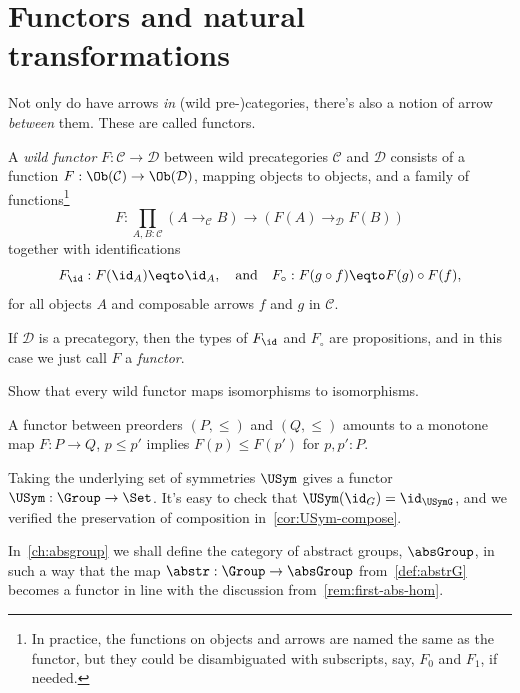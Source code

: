 \section{Functors and natural transformations}
\label{sec:naturality}

Not only do have arrows \emph{in} (wild pre-)categories, there's also
a notion of arrow \emph{between} them. These are called functors.
\begin{definition}\label{def:functor}
  A \emph{wild functor}
  $F : \mathcal C \to \mathcal D$
  between wild precategories $\mathcal C$ and $\mathcal D$
  consists of a function
  $F : \Ob(\mathcal C) \to \Ob(\mathcal D)$,
  mapping objects to objects,
  and a family of functions\footnote{%
    In practice, the functions on objects and arrows are named the same as
    the functor, but they could be disambiguated with subscripts,
    say, $F_0$ and $F_1$, if needed.}
  \[
    F : \prod_{A,B:\mathcal C}(A \to_{\mathcal C} B) \to (F(A) \to_{\mathcal D} F(B))
  \]
  together with identifications
  \[
    F_{\id} : F(\id_A) \eqto \id_A,\quad\text{and}\quad
    F_{\circ} : F(g\circ f) \eqto F(g)\circ F(f),
  \]
  for all objects $A$ and composable arrows $f$ and $g$ in $\mathcal C$.

  If $\mathcal D$ is a precategory, then the types of $F_{\id}$ and $F_{\circ}$
  are propositions, and in this case we just call $F$ a \emph{functor}.
\end{definition}
\begin{xca}\label{xca:wild-functor-isos}
  Show that every wild functor maps isomorphisms to isomorphisms.
\end{xca}
\begin{example}\label{ex:functor-preorders}
  A functor between preorders $(P,\le)$ and $(Q,\le)$ amounts to a monotone map
  $F : P\to Q$, \ie $p\le p'$ implies $F(p) \le F(p')$ for $p,p':P$.
\end{example}
\begin{example}\label{ex:USym-functor}
  Taking the underlying set of symmetries $\USym$
  gives a functor $\USym : \Group \to \Set$.
  It's easy to check that $\USym(\id_G) = \id_{\USymG}$,
  and we verified the preservation of composition
  in~\cref{cor:USym-compose}.
\end{example}
In~\cref{ch:absgroup} we shall define the category of abstract groups,
$\absGroup$,
in such a way that the map $\abstr : \Group \to \absGroup$
from~\cref{def:abstrG} becomes a functor
in line with the discussion from~\cref{rem:first-abs-hom}.

